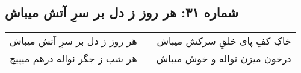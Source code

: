 \begin{center}
\section*{شماره ۳۱: هر روز ز دل بر سرِ آتش میباش}
\label{sec:031}
\begin{longtable}{l p{0.5cm} r}
هر روز ز دل بر سرِ آتش میباش
&&
خاکِ کفِ پای خلقِ سرکش میباش
\\
هر شب ز جگر نواله درهم میپیچ
&&
درخون میزن نواله و خوش میباش
\\
\end{longtable}
\end{center}
